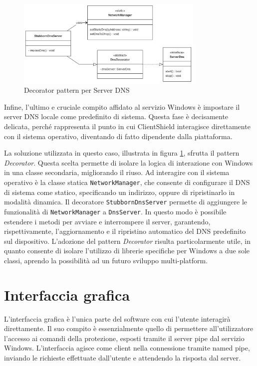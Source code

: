\documentclass[12pt,a4paper,openright,twoside]{book}
\begin{document}
\begin{figure}[H]
	\centering
	\includegraphics[width=0.8\textwidth]{figures/dns-decorator-pattern.png}
	\caption{Decorator pattern per Server DNS}
	\label{fig:dns-decorator-pattern}
\end{figure}
Infine, l'ultimo e cruciale compito affidato al servizio Windows è impostare il server \gls{DNS} locale come predefinito di sistema.
Questa fase è decisamente delicata, perché rappresenta il punto in cui ClientShield interagisce direttamente con il sistema operativo, diventando di fatto dipendente dalla piattaforma.

La soluzione utilizzata in questo caso, illustrata in figura \ref{fig:dns-decorator-pattern}, sfrutta il pattern \textit{Decorator}.
Questa scelta permette di isolare la logica di interazione con Windows in una classe secondaria, migliorando il riuso.
Ad interagire con il sistema operativo è la classe statica \texttt{NetworkManager}, che consente di configurare il \gls{DNS} di sistema come statico, specificando un indirizzo, oppure di ripristinarlo in modalità dinamica.
Il decoratore \texttt{StubbornDnsServer} permette di aggiungere le funzionalità di \texttt{NetworkManager} a \texttt{DnsServer}.
In questo modo è possibile estendere i metodi per avviare e interrompere il server, garantendo, rispettivamente, l'aggiornamento e il ripristino automatico del \gls{DNS} predefinito sul dispositivo.
L'adozione del pattern \textit{Decorator} risulta particolarmente utile, in quanto consente di isolare l'utilizzo di librerie specifiche per Windows a due sole classi, aprendo la possibilità ad un futuro sviluppo multi-platform.

\section{Interfaccia grafica}

L'interfaccia grafica è l'unica parte del software con cui l'utente interagirà direttamente.
Il suo compito è essenzialmente quello di permettere all'utilizzatore l'accesso ai comandi della protezione, esposti tramite il server pipe dal servizio Windows.
L'interfaccia agisce come client nella connessione tramite named pipe, inviando le richieste effettuate dall'utente e attendendo la risposta dal server.
\end{document}
